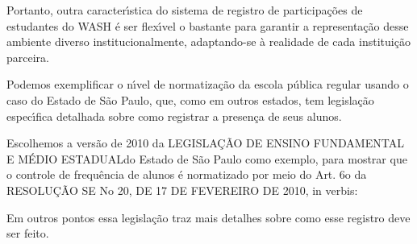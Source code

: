 \documentclass[
12pt,		%
openright,	%
twoside,  %
a4paper,			%
chapter=TITLE,		%
english,			%
french,				%
spanish,			%
brazil				%
]{USPSC-classe/USPSC}
\begin{document}
Portanto, outra caracter\'{\i}stica do sistema de registro de participa\c{c}\~oes de estudantes do WASH \'e ser flex\'{\i}vel o bastante para garantir a representa\c{c}\~ao desse ambiente diverso institucionalmente, adaptando-se \`a realidade de cada institui\c{c}\~ao parceira.














Podemos exemplificar o n\'{\i}vel de normatiza\c{c}\~ao da escola p\'ublica regular usando o caso do Estado de S\~ao Paulo, que, como em outros estados, tem legisla\c{c}\~ao espec\'{\i}fica detalhada sobre como registrar a presen\c{c}a de seus alunos.














Escolhemos a vers\~ao de 2010 da \textquotedbl LEGISLA\c{C}\~AO DE ENSINO FUNDAMENTAL E M\'EDIO ESTADUAL\textquotedbl  do Estado de S\~ao Paulo como exemplo, para mostrar que o controle de frequ\^encia de alunos \'e normatizado por meio do Art. 6o da RESOLU\c{C}\~AO SE No 20, DE 17 DE FEVEREIRO DE 2010, in verbis:















\noindent\begin{center}\mbox{\centering{}}\end{center}


Em outros pontos essa legisla\c{c}\~ao traz mais detalhes sobre como esse registro deve ser feito.
\end{document}
